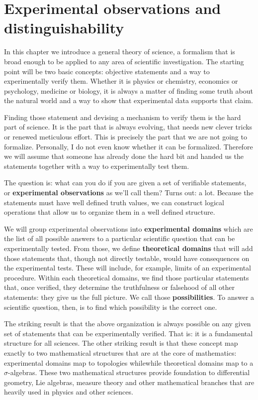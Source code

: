 \documentclass[11pt,letterpaper,fleqn]{memoir} %
\begin{document}
\chapter{Experimental observations and distinguishability}

In this chapter we introduce a general theory of science, a formalism that is broad enough to be applied to any area of scientific investigation. The starting point will be two basic concepts: objective statements and a way to experimentally verify them. Whether it is physics or chemistry, economics or psychology, medicine or biology, it is always a matter of finding some truth about the natural world and a way to show that experimental data supports that claim.

Finding those statement and devising a mechanism to verify them is the hard part of science. It is the part that is always evolving, that needs new clever tricks or renewed meticulous effort. This is precisely the part that we are not going to formalize. Personally, I do not even know whether it can be formalized. Therefore we will assume that someone has already done the hard bit and handed us the statements together with a way to experimentally test them.

The question is: what can you do if you are given a set of verifiable statements, or \textbf{experimental observations} as we'll call them? Turns out: a lot. Because the statements must have well defined truth values, we can construct logical operations that allow us to organize them in a well defined structure.

We will group experimental observations into \textbf{experimental domains} which are the list of all possible answers to a particular scientific question that can be experimentally tested. From those, we define \textbf{theoretical domains} that will add those statements that, though not directly testable, would have consequences on the experimental tests. These will include, for example, limits of an experimental procedure. Within each theoretical domains, we find those particular statements that, once verified, they determine the truthfulness or falsehood of all other statements: they give us the full picture. We call those \textbf{possibilities}. To answer a scientific question, then, is to find which possibility is the correct one.

The striking result is that the above organization is always possible on any given set of statements that can be experimentally verified. That is: it is a fundamental structure for all sciences. The other striking result is that these concept map exactly to two mathematical structures that are at the core of mathematics: experimental domains map to topologies whilewhile theoretical domains map to a $\sigma$-algebras. These two mathematical structures provide foundation to differential geometry, Lie algebras, measure theory and other mathematical branches that are heavily used in physics and other sciences.
\end{document}
